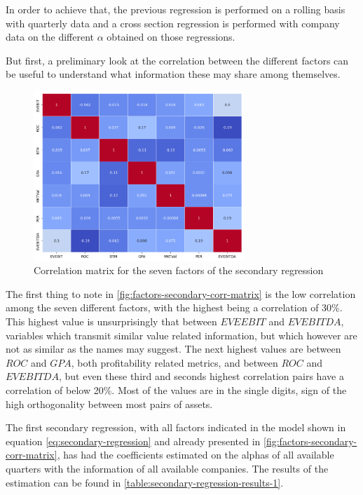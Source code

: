 In order to achieve that, the previous regression is performed on a rolling basis with quarterly data and a cross section regression is performed with company data on the different $\alpha$ obtained on those regressions. 

But first, a preliminary look at the correlation between the different factors can be useful to understand what information these may share among themselves. 

\begin{figure}[ht]
    \centering
    \includegraphics[width=300px]{assets/factors-secondary-corr-matrix.png}
    \caption{Correlation matrix for the seven factors of the secondary regression}
    \label{fig:factors-secondary-corr-matrix}
\end{figure}

The first thing to note in \autoref{fig:factors-secondary-corr-matrix} is the low correlation among the seven different factors, with the highest being a correlation of 30\%. This highest value is unsurprisingly that between $EVEEBIT$ and $EVEBITDA$, variables which transmit similar value related information, but which however are not as similar as the names may suggest. The next highest values are between $ROC$ and $GPA$, both profitability related metrics, and between $ROC$ and $EVEBITDA$, but even these third and seconds highest correlation pairs have a correlation of below 20\%. Most of the values are in the single digits, sign of the high orthogonality between most pairs of assets. 

The first secondary regression, with all factors indicated in the model shown in equation \eqref{eq:secondary-regression} and already presented in \autoref{fig:factors-secondary-corr-matrix}, has had the coefficients estimated on the alphas of all available quarters with the information of all available companies. The results of the estimation can be found in \autoref{table:secondary-regression-results-1}.


